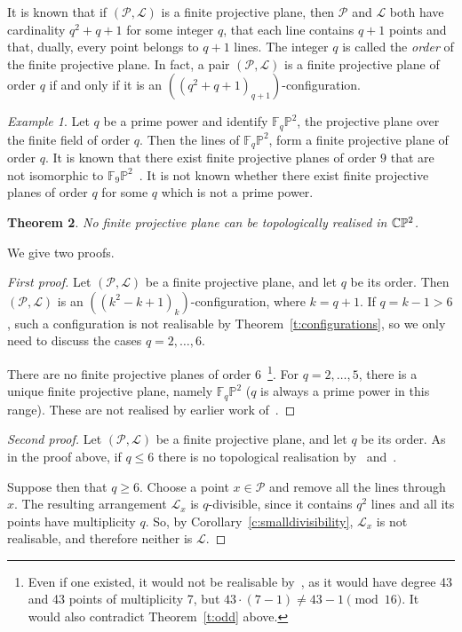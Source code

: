 \documentclass[a4paper,12pt, onesided]{amsart}
\newtheorem{thm}{Theorem}[section]
\theoremstyle{remark}
\newtheorem{ex}[thm]{Example}
\newtheorem{remark}[thm]{Remark}
\numberwithin{figure}{section}
\numberwithin{equation}{section}
\newcommand{\F}{\mathbb{F}}
\renewcommand{\P}{\mathbb{P}}
\newcommand{\cP}{\mathcal{P}}
\newcommand{\CP}{\mathbb{CP}\vphantom{\mathbb{P}}^2}
\renewcommand{\L}{\mathcal{L}}
\newcommand{\MG}[1]{\marginpar{\tiny\color{red}{\bf MG}: {#1}}}
\begin{document}
It is known that if $(\mathcal{P}, \L)$ is a finite projective plane, then $\mathcal{P}$ and $\L$ both have cardinality $q^2+q+1$ for some integer $q$, that each line contains $q+1$ points and that, dually, every point belongs to $q+1$ lines.
The integer $q$ is called the \emph{order} of the finite projective plane.
In fact, a pair $(\mathcal{P}, \L)$ is a finite projective plane of order $q$ if and only if it is an $((q^2+q+1)_{q+1})$-configuration.

\begin{ex}
Let $q$ be a prime power and identify $\F_q\P^2$, the projective plane over the finite field of order $q$. Then the lines of $\F_q\P^2$, form a finite projective plane of order $q$.
It is known that there exist finite projective planes of order $9$ that are not isomorphic to $\F_9\P^2$~\cite{Hall-Swift-Killgrove:1959}.
It is not known whether there exist finite projective planes of order $q$ for some $q$ which is not a prime power.
\end{ex}

\begin{thm}\label{t:nofinite}
No finite projective plane can be topologically realised in $\CP$.
\end{thm}

We give two proofs.

\begin{proof}[First proof]
Let $(\cP,\L)$ be a finite projective plane, and let $q$ be its order.
Then $(\cP,\L)$ is an $((k^2-k+1)_k)$-configuration, where $k = q+1$.
If $q = k-1 > 6$, such a configuration is not realisable by Theorem~\ref{t:configurations}, so we only need to discuss the cases $q = 2,\dots, 6$.

There are no finite projective planes of order 6~\cite{Lam:1991}\footnote{Even if one existed, it would not be realisable by~\cite[Theorem~3]{Golla:2024}, as it would have degree 43 and 43 points of multiplicity 7, but $43\cdot(7-1) \neq 43-1 \pmod{16}$. It would also contradict Theorem~\ref{t:odd} above.}.
For $q = 2,\dots, 5$, there is a unique finite projective plane, namely $\mathbb{F}_q\P^2$ ($q$ is always a prime power in this range).
These are not realised by earlier work of~\cite{Ruberman-Starkston:2016}.
\end{proof}

\begin{proof}[Second proof]
Let $(\cP,\L)$ be a finite projective plane, and let $q$ be its order.
As in the proof above, if $q \le 6$ there is no topological realisation by~\cite{Ruberman-Starkston:2016} and~\cite{Lam:1991}.

Suppose then that $q \ge 6$. Choose a point $x \in \cP$ and remove all the lines through $x$.
The resulting arrangement $\L_x$ is $q$-divisible, since it contains $q^2$ lines and all its points have multiplicity $q$.
So, by Corollary~\ref{c:smalldivisibility}, $\L_x$ is not realisable, and therefore neither is $\L$.
\end{proof}
\end{document}
